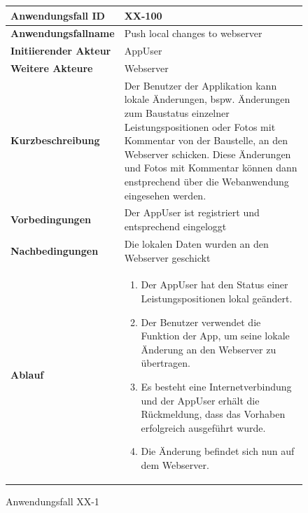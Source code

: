 \newpage

\begin{figure}[h]
	\centering
	\begin{tabularx}{\textwidth}{ X | X }
		\textbf{Anwendungsfall ID} & XX-100 \\ \hline
		\textbf{Anwendungsfallname} & Push local changes to webserver\\ \hline
		\textbf{Initiierender Akteur} & AppUser \\ \hline
		\textbf{Weitere Akteure} & Webserver  \\ \hline
		\textbf{Kurzbeschreibung} & Der Benutzer der Applikation kann lokale \"Anderungen,  bspw. \"Anderungen zum Baustatus einzelner Leistungspositionen oder Fotos mit Kommentar von der Baustelle,  an den Webserver schicken.  Diese \"Anderungen und Fotos mit Kommentar k\"onnen dann enstprechend  \"uber die Webanwendung eingesehen werden.  \\ \hline
		\textbf{Vorbedingungen} & Der AppUser ist registriert und entsprechend eingeloggt \\ \hline
		\textbf{Nachbedingungen} & Die lokalen Daten wurden an den Webserver geschickt\\ \hline
		\textbf{Ablauf} &
			\begin{enumerate}
				\item Der AppUser hat den Status einer Leistungspositionen  lokal ge\"andert.
				\item Der Benutzer verwendet die Funktion der App,  um seine lokale \"Anderung an den Webserver zu \"ubertragen.
				\item Es besteht eine Internetverbindung und der AppUser erh\"alt die R\"uckmeldung,  dass das Vorhaben erfolgreich ausgef\"uhrt wurde.  
				\item Die \"Anderung befindet sich nun auf dem Webserver.
			\end{enumerate}
			\end{tabularx}
	\caption{Anwendungsfall XX-1}
	\label{fig:anwendungsfall-app-tabelle-xx-1}
\end{figure}

